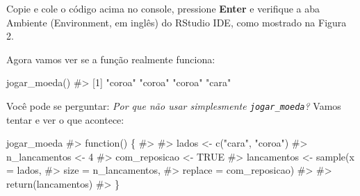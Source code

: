 \documentclass[
  letterpaper,
]{book}
\newenvironment{Shaded}{\begin{snugshade}}{\end{snugshade}}
\newcommand{\CommentTok}[1]{\textcolor[rgb]{0.37,0.37,0.37}{#1}}
\newcommand{\FunctionTok}[1]{\textcolor[rgb]{0.28,0.35,0.67}{#1}}
\newcommand{\NormalTok}[1]{\textcolor[rgb]{0.00,0.23,0.31}{#1}}
\theoremstyle{definition}
\theoremstyle{plain}
\theoremstyle{remark}
\begin{document}
Copie e cole o código acima no console, pressione \textbf{Enter} e
verifique a aba Ambiente (Environment, em inglês) do RStudio IDE, como
mostrado na Figura 2.

\begin{figure}


\caption{\label{fig-help-sample-replace}}

\end{figure}%

Agora vamos ver se a função realmente funciona:

\begin{Shaded}
\begin{Highlighting}[]
\FunctionTok{jogar\_moeda}\NormalTok{()}
\CommentTok{\#\textgreater{} [1] "coroa" "coroa" "coroa" "cara"}
\end{Highlighting}
\end{Shaded}

Você pode se perguntar: \emph{Por que não usar simplesmente
\texttt{jogar\_moeda}?} Vamos tentar e ver o que acontece:

\begin{Shaded}
\begin{Highlighting}[]
\NormalTok{jogar\_moeda}
\CommentTok{\#\textgreater{} function() \{}
\CommentTok{\#\textgreater{}   }
\CommentTok{\#\textgreater{}   lados \textless{}{-} c("cara", "coroa")}
\CommentTok{\#\textgreater{}   n\_lancamentos \textless{}{-} 4}
\CommentTok{\#\textgreater{}   com\_reposicao \textless{}{-} TRUE}
\CommentTok{\#\textgreater{}   lancamentos \textless{}{-} sample(x = lados, }
\CommentTok{\#\textgreater{}                         size = n\_lancamentos, }
\CommentTok{\#\textgreater{}                         replace = com\_reposicao)}
\CommentTok{\#\textgreater{}   }
\CommentTok{\#\textgreater{}   return(lancamentos)}
\CommentTok{\#\textgreater{} \}}
\end{Highlighting}
\end{Shaded}
\end{document}
